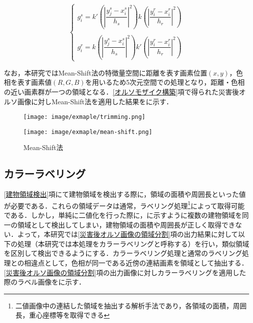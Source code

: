       \begin{equation}
        \label{Mean-Shift法3}
        \left\{
          \begin{array}{l}
            g_{i}^s = k' (|\dfrac{y_{j}^s - x_{i}^s} {h_{s}}|^2)
              k  (|\dfrac{y_{i}^r - x_{i}^r} {h_{r}}|^2) \\ \\
            g_{i}^r = k  (|\dfrac{y_{j}^s - x_{i}^s} {h_{s}}|^2) 
              k' (|\dfrac{y_{i}^r - x_{i}^r} {h_{r}}|^2)
          \end{array}
        \right.
      \end{equation}

      なお，本研究ではMean-Shift法の特徴量空間に距離を表す画素位置$(x,y)$，色相を表す画素値$(R,G,B)$を用いるため5次元空間での処理となり，距離・色相の近い画素群が一つの領域となる．\ref{オルソモザイク構築}項で得られた災害後オルソ画像に対しMean-Shift法を適用した結果をに示す．

      \begin{figure}[tbp]
        \begin{minipage}[c]{0.5\hsize}
          \centering
          \texttt{[image: image/exmaple/trimming.png]}
        \end{minipage}
        \begin{minipage}[c]{0.45\hsize}
          \centering
          \texttt{[image: image/exmaple/mean-shift.png]}
        \end{minipage}
        \caption{Mean-Shift法}
        \label{Mean-Shift法}
      \end{figure}


    \subsection{カラーラベリング}
      \label{カラーラベリング}
      \ref{建物領域検出}項にて建物領域を検出する際に，領域の面積や周囲長といった値が必要である．これらの領域データは通常，ラベリング処理\footnote{二値画像中の連結した領域を抽出する解析手法であり，各領域の面積，周囲長，重心座標等を取得できる}によって取得可能である．しかし，単純に二値化を行った際に，に示すように複数の建物領域を同一の領域として検出してしまい，建物領域の面積や周囲長が正しく取得できない．よって，本研究では\ref{災害後オルソ画像の領域分割}項の出力結果に対して以下の処理（本研究では本処理をカラーラベリングと呼称する）を行い，類似領域を区別して検出できるようにする．カラーラベリング処理と通常のラベリング処理との相違点として，色相が同一である近傍の連結画素を領域として抽出する．\ref{災害後オルソ画像の領域分割}項の出力画像に対しカラーラベリングを適用した際のラベル画像をに示す．

